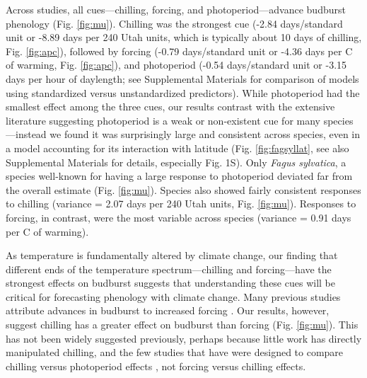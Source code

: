 \documentclass{article}
\begin{document}
\par Across studies, all cues---chilling, forcing, and photoperiod---advance budburst phenology (Fig. \ref {fig:mu}). Chilling was the strongest cue (-2.84 days/standard unit or -8.89 days per 240 Utah units, which is typically about 10 days of chilling, Fig. \ref {fig:apc}), followed by forcing (-0.79 days/standard unit or -4.36 days per \degree C of warming, Fig. \ref {fig:apc}), and photoperiod (-0.54 days/standard unit or -3.15 days per hour of daylength; see Supplemental Materials for comparison of models using standardized versus unstandardized predictors). While photoperiod had the smallest effect among the three cues, our results contrast with the extensive literature suggesting photoperiod is a weak or non-existent cue for many species \citep{zohner2016,koerner2010a}---instead we found it was surprisingly large and consistent across species, even in a model accounting for its interaction with latitude (Fig. \ref {fig:fagsyllat}, see also Supplemental Materials for details, especially Fig. 1S). Only \emph{Fagus sylvatica}, a species well-known for having a large response to photoperiod deviated far from the overall estimate (Fig. \ref {fig:mu}). Species also showed fairly consistent responses to chilling (variance = 2.07 days per 240 Utah units, Fig. \ref {fig:mu}).
Responses to forcing, in contrast, were the most variable across species (variance = 0.91 days per \degree C of warming).

\par As temperature is fundamentally altered by climate change, our finding that different ends of the temperature spectrum---chilling and forcing---have the strongest effects on budburst suggests that understanding these cues will be critical for forecasting phenology with climate change. Many previous studies attribute advances in budburst to increased forcing \citep{Basler:2014aa,bradley1999,menzel2006,harrington2015}. %
Our results, however, suggest chilling has a greater effect on budburst than forcing (Fig. \ref{fig:mu}). This has not been widely suggested previously, perhaps because little work has directly manipulated chilling, and the few studies that have were designed to compare chilling versus photoperiod effects \citep[e.g., ][]{Basler:2014aa,Caffarra:2011qf,Laube:2014a,zohner2016}, not forcing versus chilling effects. 
\end{document}
